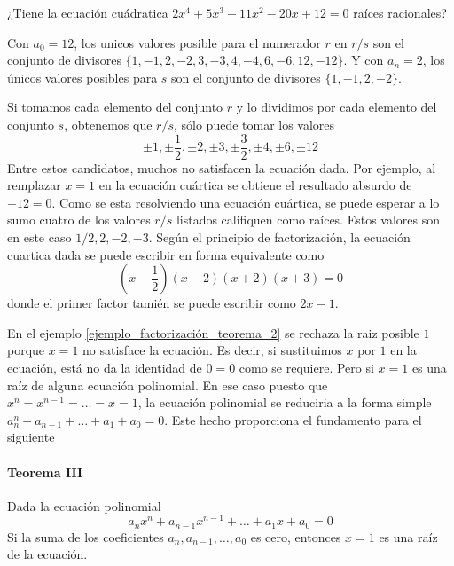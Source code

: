 \begin{ejemplo}
    \label{ejemplo_factorización_teorema_2}
    ¿Tiene la ecuación cuádratica \(2x^4+5x^3-11x^2-20x+12=0\) raíces racionales?

    Con \(a_0=12\), los unicos valores posible para el numerador \(r\) en \(r/s\) son el conjunto de divisores \(\{1,-1,2,-2,3,-3,4,-4,6,-6,12,-12\}\). Y con \(a_n=2\), los únicos valores posibles para \(s\) son el conjunto de divisores \(\{1,-1,2,-2\}\). 

    Si tomamos cada elemento del conjunto \(r\) y lo dividimos por cada elemento del conjunto \(s\), obtenemos que \(r/s\), sólo puede tomar los valores
    \[
    \pm 1, \pm \frac{1}{2}, \pm 2, \pm 3, \pm \frac{3}{2}, \pm 4, \pm 6, \pm 12
    \]
    Entre estos candidatos, muchos no satisfacen la ecuación dada. Por ejemplo, al remplazar \(x = 1\) en la ecuación cuártica se obtiene el resultado absurdo de \(-12 = 0\). Como se esta resolviendo una ecuación cuártica, se puede esperar a lo sumo cuatro de los valores \(r/s\) listados califiquen como raíces. Estos valores son en este caso \(1/2,2,-2,-3\). Según el principio de factorización, la ecuación cuartica dada se puede escribir en forma equivalente como 
    \[
    (x-\frac{1}{2})(x-2)(x+2)(x+3)=0
    \]
    donde el primer factor tamién se puede escribir como \(2x-1\).
\end{ejemplo}

En el ejemplo \ref{ejemplo_factorización_teorema_2} se rechaza la raiz posible \(1\) porque \(x=1\) no satisface la ecuación. Es decir, si sustituimos \(x\) por \(1\) en la ecuación, está no da la identidad de \(0=0\) como se requiere.
Pero si \(x=1\) es una raíz de alguna ecuación polinomial. En ese caso puesto que \(x^n=x^{n-1}=\dots=x=1\), la ecuación polinomial se reduciria a la forma simple \(a_n^n + a_{n-1}+\dots+a_1+a_0 = 0\). Este hecho proporciona el fundamento para el siguiente 

\paragraph{Teorema III}

Dada la ecuación polinomial 
\[
a_nx^n + a_{n-1}x^{n-1}+\dots+a_1x+a_0 = 0
\]
Si la suma de los coeficientes \(a_n,a_{n-1},\dots,a_0\) es cero, entonces \(x=1\) es una raíz de la ecuación.


